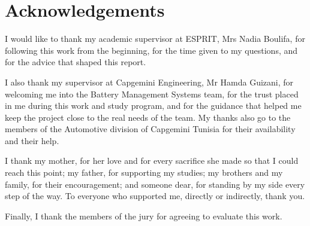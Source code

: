 \chapter*{Acknowledgements}

I would like to thank my academic supervisor at ESPRIT, Mrs Nadia Boulifa, for following this work from the beginning, for the time given to my questions, and for the advice that shaped this report.

I also thank my supervisor at Capgemini Engineering, Mr Hamda Guizani, for welcoming me into the Battery Management Systems team, for the trust placed in me during this work and study program, and for the guidance that helped me keep the project close to the real needs of the team. My thanks also go to the members of the Automotive division of Capgemini Tunisia for their availability and their help.

I thank my mother, for her love and for every sacrifice she made so that I could reach this point; my father, for supporting my studies; my brothers and my family, for their encouragement; and someone dear, for standing by my side every step of the way. To everyone who supported me, directly or indirectly, thank you.

Finally, I thank the members of the jury for agreeing to evaluate this work.

\cleardoublepage
